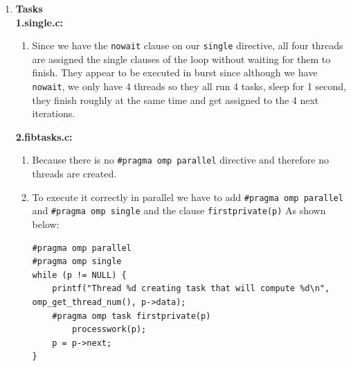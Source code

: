 \begin{enumerate}[label=\textbf{\Alph*)}]
\begin{enumerate}[label=\arabic*.]
        It seems there is no specific order in which the threads exit the barrier although in our experiments, most of the time, the last thread that
        outputs the \emph{wakes up and enters barrier} message is the first to exit it.
    \end{enumerate}
    \textbf{3.ordered.c:}
    \begin{enumerate}[label=\arabic*.]
        \item The order of the \emph{Outside} messages is non-deterministic since it depends on the dynamic scheduling of the threads.
        In the other hand, the order of the \emph{Inside} messages is always the same relative to themselves and they follow the order
        that the loop would have if executed sequentially (0, 1, 2, \dots, N).
        \item If we modify the clause \texttt{schedule} to include a chunk size of 2 like so: \texttt{schedule( dynamic, 2)} the tasks
        will get assigned 2 consecutive iteration of the loop.
    \end{enumerate}
    \pagebreak
    \item \textbf{Tasks} \\
    \textbf{1.single.c:}
    \begin{enumerate}[label=\arabic*.]
        \item Since we have the \texttt{nowait} clause on our \texttt{single} directive, all four threads are assigned the single clauses
        of the loop without waiting for them to finish. They appear to be executed in burst since although we have \texttt{nowait}, we only
        have 4 threads so they all run 4 tasks, sleep for 1 second, they finish roughly at the same time and get assigned to the 4 next iterations.
    \end{enumerate}
    \textbf{2.fibtasks.c:}
    \begin{enumerate}[label=\arabic*.]
        \item Because there is no \texttt{#pragma omp parallel} directive and therefore no threads are created.
        \item To execute it correctly in parallel we have to add \texttt{#pragma omp parallel}
         and \texttt{#pragma omp single} and the clause \texttt{firstprivate(p)} As shown below:

    \begin{verbatim}
#pragma omp parallel
#pragma omp single
while (p != NULL) {
    printf("Thread %d creating task that will compute %d\n", omp_get_thread_num(), p->data);
    #pragma omp task firstprivate(p)
        processwork(p);
    p = p->next;
}
    \end{verbatim}
     

\end{enumerate}
\end{enumerate}
